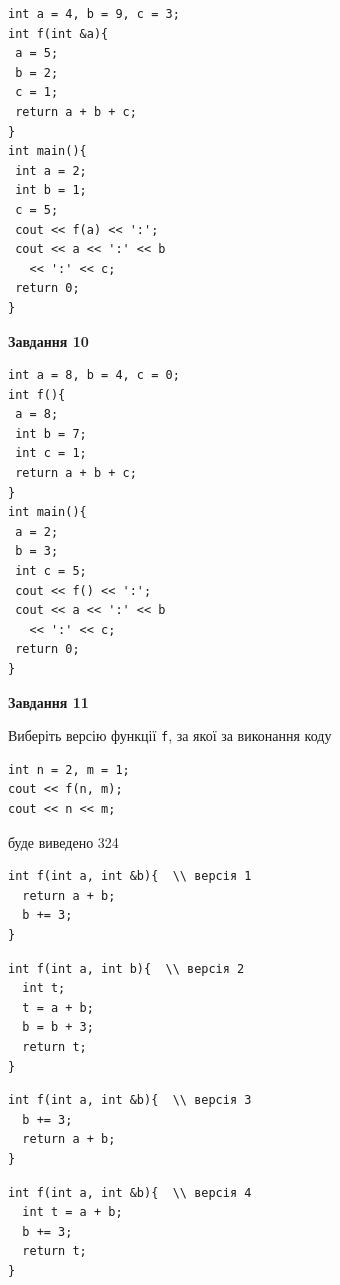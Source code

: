 \documentclass[12pt, ukrainian]{article}
\def\code#1{\Verb!#1!}
\begin{document}
{\begin {large}
\begin{minipage}[t]{7.0cm}
\begin{verbatim}
int a = 4, b = 9, c = 3;
int f(int &a){
 a = 5;
 b = 2;
 c = 1;
 return a + b + c;
}
int main(){
 int a = 2;
 int b = 1;
 c = 5;
 cout << f(a) << ':';
 cout << a << ':' << b 
   << ':' << c;
 return 0;
}
\end{verbatim}



\begin{center}
\textbf{Завдання 10}
\end{center}
\vspace{-8mm}

\begin{verbatim}
int a = 8, b = 4, c = 0;
int f(){
 a = 8;
 int b = 7;
 int c = 1;
 return a + b + c;
}
int main(){
 a = 2;
 b = 3;
 int c = 5;
 cout << f() << ':';
 cout << a << ':' << b 
   << ':' << c;
 return 0;
}
\end{verbatim}

\end{minipage}
\vline \hspace{1mm}
\begin{minipage}[t]{11.0cm}

\begin{center}
\textbf{Завдання 11}
\end{center}
Виберіть версію функції \code{f}, за якої за виконання коду
\begin{verbatim}
int n = 2, m = 1;
cout << f(n, m);
cout << n << m;
\end{verbatim}

буде виведено 324

\begin{verbatim}
int f(int a, int &b){  \\ версія 1
  return a + b;
  b += 3;
}
\end{verbatim}

\vspace{-8mm}\begin{verbatim}
int f(int a, int b){  \\ версія 2
  int t;
  t = a + b;
  b = b + 3;
  return t;
}
\end{verbatim}

\vspace{-8mm}\begin{verbatim}
int f(int a, int &b){  \\ версія 3
  b += 3;
  return a + b;
}
\end{verbatim}

\vspace{-8mm}\begin{verbatim}
int f(int a, int &b){  \\ версія 4
  int t = a + b;
  b += 3;
  return t;
}
\end{verbatim}




\end{minipage}
\end{large}}
\end{document}
